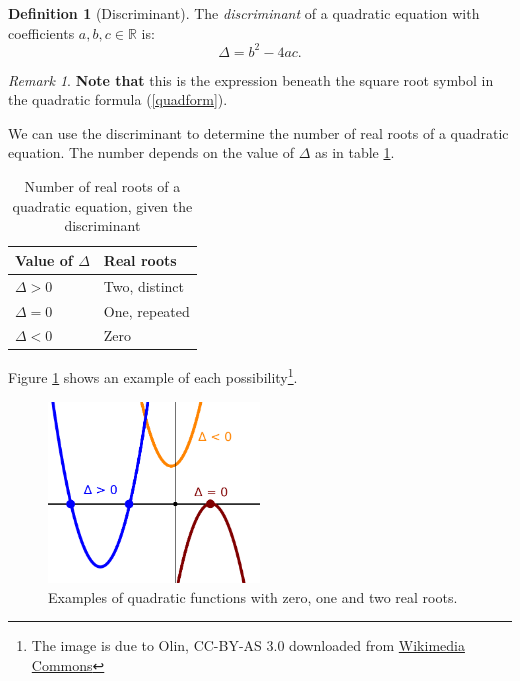 \documentclass[12pt,a4paper]{article}
\theoremstyle{definition}
\newtheorem{definition}[proposition]{Definition}
\theoremstyle{remark}
\newtheorem{remark}[proposition]{Remark}
\begin{document}
\begin{definition}[Discriminant]
The \emph{discriminant} of a quadratic equation with coefficients \(a, b, c \in \mathbb{R}\) is:
\[
\Delta = b^2 - 4ac.
\]
\end{definition}

\begin{remark}
{\bf Note that} this is the expression beneath the square root symbol in the quadratic formula (\ref{quadform}).
\end{remark}

We can use the discriminant to determine the number of real roots of a quadratic equation. The number depends on the value of \(\Delta\) as in table \ref{Distable}.
\begin{table}[!h]
\begin{center}
\begin{tabular}{|l|l|}
\hline
Value of \(\Delta\) & Real roots \\
\hline
\(\Delta > 0\) & Two, distinct\\
\(\Delta = 0\) & One, repeated\\
\(\Delta < 0\) & Zero\\
\hline
\end{tabular}
\end{center}
\caption{Number of real roots of a quadratic equation, given the discriminant}
\label{Distable}
\end{table}

Figure \ref{DisFig} shows an example of each possibility\footnote{The image is due to Olin, CC-BY-AS 3.0 downloaded from \href{https://commons.wikimedia.org/wiki/File:Quadratic_eq_discriminant.svg}{Wikimedia Commons}}.
\begin{figure}[!h]
\begin{center}
\includegraphics[width=0.5\textwidth]{Quadratic_eq_discriminant.pdf}
\end{center}
\caption{Examples of quadratic functions with zero, one and two real roots.}
\label{DisFig}
\end{figure}
\end{document}
